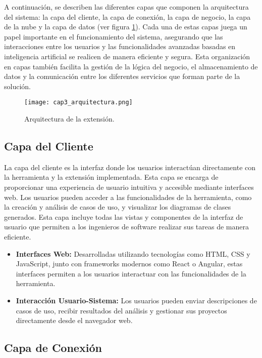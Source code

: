 A continuación, se describen las diferentes capas que componen la arquitectura del sistema: la capa del cliente, la capa de conexión, la capa de negocio, la capa de la nube y la capa de datos (ver figura \ref{fig:cap3_arquitectura}). Cada una de estas capas juega un papel importante en el funcionamiento del sistema, asegurando que las interacciones entre los usuarios y las funcionalidades avanzadas basadas en inteligencia artificial se realicen de manera eficiente y segura. Esta organización en capas también facilita la gestión de la lógica del negocio, el almacenamiento de datos y la comunicación entre los diferentes servicios que forman parte de la solución.

\begin{figure}[H]  
	\centering
	\texttt{[image: cap3\_arquitectura.png]}
	\caption{Arquitectura de la extensión.}
	\label{fig:cap3_arquitectura}
\end{figure}


\subsection{Capa del Cliente}

La capa del cliente es la interfaz donde los usuarios interactúan directamente con la herramienta y la extensión implementada. Esta capa se encarga de proporcionar una experiencia de usuario intuitiva y accesible mediante interfaces web. Los usuarios pueden acceder a las funcionalidades de la herramienta, como la creación y análisis de casos de uso, y visualizar los diagramas de clases generados. Esta capa incluye todas las vistas y componentes de la interfaz de usuario que permiten a los ingenieros de software realizar sus tareas de manera eficiente.

\begin{itemize}
	\item \textbf{Interfaces Web:} Desarrolladas utilizando tecnologías como HTML, CSS y JavaScript, junto con frameworks modernos como React o Angular, estas interfaces permiten a los usuarios interactuar con las funcionalidades de la herramienta.
	\item \textbf{Interacción Usuario-Sistema:} Los usuarios pueden enviar descripciones de casos de uso, recibir resultados del análisis y gestionar sus proyectos directamente desde el navegador web.
\end{itemize}

\subsection{Capa de Conexión}

